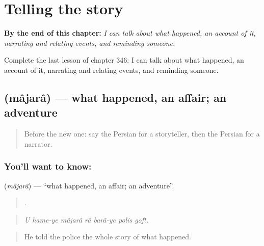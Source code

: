 
\chapter{Telling the story}
\label{ch:fa-telling-the-story}

\begin{chapteropening}
\textbf{By the end of this chapter:} \emph{I can talk about what happened, an account of it, narrating and relating events, and reminding someone.}

Complete the last lesson of chapter 346: I can talk about what happened, an account of it, narrating and relating events, and reminding someone.
\end{chapteropening}

\section[\texorpdfstring{\fa{ماجرا} (mâjarâ)}{ماجرا (mâjarâ)}]{ (mâjarâ) — what happened, an affair; an adventure}

\label{lesson:FA-C346-majara}



\begin{quote}
Before the new one: say the Persian for a storyteller, then the Persian for a narrator.
\end{quote}

\subsection*{You'll want to know: }
\textbf{} (\emph{mâjarâ}) — \textquotedblleft{}what happened, an affair; an adventure\textquotedblright{}.

\begin{quote}
      .
\end{quote}

\begin{quote}
\emph{U hame-ye mâjarâ râ barâ-ye polis goft.}
\end{quote}

\begin{quote}
He told the police the whole story of what happened.
\end{quote}

